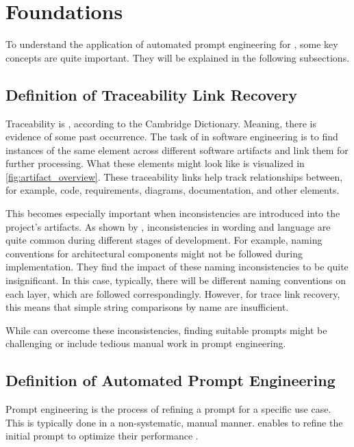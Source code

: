 \chapter{Foundations}

To understand the application of automated prompt engineering for \TLR, some key concepts are quite important. They will be explained in the following subsections.


\section{Definition of Traceability Link Recovery}
Traceability is , according to the Cambridge Dictionary. Meaning, there is evidence of some past occurrence. 
The task of \TLR in software engineering is to find instances of the same element across different software artifacts and link them for further processing. What these elements might look like is visualized in \autoref{fig:artifact_overview}. These traceability links help track relationships between, for example, code, requirements, diagrams, documentation, and other elements.

This becomes especially important when inconsistencies are introduced into the project's artifacts. As shown by , inconsistencies in wording and language are quite common during different stages of development. For example, naming conventions for architectural components might not be followed during implementation. They find the impact of these naming inconsistencies to be quite insignificant. In this case, typically, there will be different naming conventions on each layer, which are followed correspondingly. However, for trace link recovery, this means that simple string comparisons by name are insufficient.

While \LLMs can overcome these inconsistencies, finding suitable prompts might be challenging or include tedious manual work in prompt engineering. 


\section{Definition of Automated Prompt Engineering}
\label{foundations:sec:automated_prompt_engineering}
Prompt engineering is the process of refining a prompt for a specific use case. This is typically done in a non-systematic, manual manner. \APE enables \LLMs to refine the initial prompt to optimize their performance \cite{zadenoori2025AutomaticPrompt}. 

